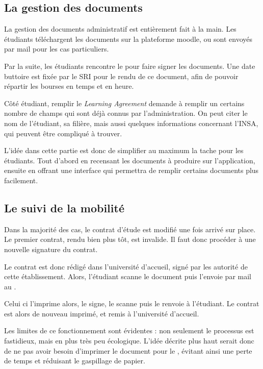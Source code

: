 		\subsection{La gestion  des documents}
		La gestion des documents administratif est entièrement fait à la main. Les étudiants téléchargent les documents sur la plateforme moodle, ou sont envoyés par mail pour les cas particuliers. 
                
                Par la suite, les étudiants rencontre le \ri pour faire signer les documents. Une date buttoire est fixée par le SRI pour le rendu de ce document, afin de pouvoir répartir les bourses en temps et en heure. 

\medbreak

Côté étudiant, remplir le \textit{Learning Agreement} demande à remplir un certains nombre de champs qui sont déjà connus par l'administration. On peut citer le nom de l'étudiant, sa filière, mais aussi quelques informations concernant l'INSA, qui peuvent être compliqué à trouver. 

\medbreak

L'idée dans cette partie est donc de simplifier au maximum la tache pour les étudiants. Tout d'abord en recensant les documents à produire sur l'application, ensuite en offrant une interface qui permettra de remplir certains documents plus facilement. 

\subsection{Le suivi de la mobilité}

Dans la majorité des cas, le contrat d'étude est modifié une fois arrivé sur place. Le premier contrat, rendu bien plus tôt, est invalide. Il faut donc procéder à une nouvelle signature du contrat. 

Le contrat est donc rédigé dans l'université d'accueil, signé par les autorité de cette établissement. Alors, l'étudiant scanne  le document puis l'envoie par mail au \ri. 

Celui ci l'imprime alors, le signe, le scanne puis le renvoie à l'étudiant. Le contrat est alors de nouveau imprimé, et remis à l'université d'accueil. 

\medbreak

Les limites de ce fonctionnement sont évidentes : non seulement le processus est fastidieux, mais en plus très peu écologique. L'idée décrite plus haut serait donc de ne pas avoir besoin d'imprimer le document pour le \ri, évitant ainsi une perte de temps et réduisant le gaspillage de papier. 

